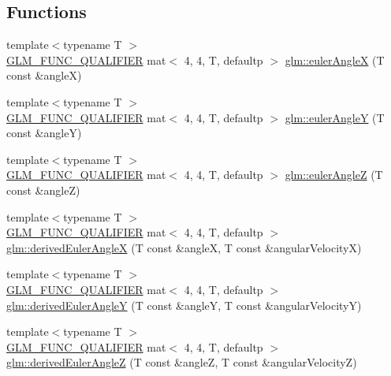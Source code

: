 \subsection*{Functions}
\begin{DoxyCompactItemize}
\item 
{\footnotesize template$<$typename T $>$ }\\\mbox{\hyperlink{setup_8hpp_a33fdea6f91c5f834105f7415e2a64407}{G\+L\+M\+\_\+\+F\+U\+N\+C\+\_\+\+Q\+U\+A\+L\+I\+F\+I\+ER}} mat$<$ 4, 4, T, defaultp $>$ \mbox{\hyperlink{group__gtx__euler__angles_gafba6282e4ed3ff8b5c75331abfba3489}{glm\+::euler\+AngleX}} (T const \&angleX)
\item 
{\footnotesize template$<$typename T $>$ }\\\mbox{\hyperlink{setup_8hpp_a33fdea6f91c5f834105f7415e2a64407}{G\+L\+M\+\_\+\+F\+U\+N\+C\+\_\+\+Q\+U\+A\+L\+I\+F\+I\+ER}} mat$<$ 4, 4, T, defaultp $>$ \mbox{\hyperlink{group__gtx__euler__angles_gab84bf4746805fd69b8ecbb230e3974c5}{glm\+::euler\+AngleY}} (T const \&angleY)
\item 
{\footnotesize template$<$typename T $>$ }\\\mbox{\hyperlink{setup_8hpp_a33fdea6f91c5f834105f7415e2a64407}{G\+L\+M\+\_\+\+F\+U\+N\+C\+\_\+\+Q\+U\+A\+L\+I\+F\+I\+ER}} mat$<$ 4, 4, T, defaultp $>$ \mbox{\hyperlink{group__gtx__euler__angles_ga5b3935248bb6c3ec6b0d9297d406e251}{glm\+::euler\+AngleZ}} (T const \&angleZ)
\item 
{\footnotesize template$<$typename T $>$ }\\\mbox{\hyperlink{setup_8hpp_a33fdea6f91c5f834105f7415e2a64407}{G\+L\+M\+\_\+\+F\+U\+N\+C\+\_\+\+Q\+U\+A\+L\+I\+F\+I\+ER}} mat$<$ 4, 4, T, defaultp $>$ \mbox{\hyperlink{group__gtx__euler__angles_ga994b8186b3b80d91cf90bc403164692f}{glm\+::derived\+Euler\+AngleX}} (T const \&angleX, T const \&angular\+VelocityX)
\item 
{\footnotesize template$<$typename T $>$ }\\\mbox{\hyperlink{setup_8hpp_a33fdea6f91c5f834105f7415e2a64407}{G\+L\+M\+\_\+\+F\+U\+N\+C\+\_\+\+Q\+U\+A\+L\+I\+F\+I\+ER}} mat$<$ 4, 4, T, defaultp $>$ \mbox{\hyperlink{group__gtx__euler__angles_ga0a4c56ecce7abcb69508ebe6313e9d10}{glm\+::derived\+Euler\+AngleY}} (T const \&angleY, T const \&angular\+VelocityY)
\item 
{\footnotesize template$<$typename T $>$ }\\\mbox{\hyperlink{setup_8hpp_a33fdea6f91c5f834105f7415e2a64407}{G\+L\+M\+\_\+\+F\+U\+N\+C\+\_\+\+Q\+U\+A\+L\+I\+F\+I\+ER}} mat$<$ 4, 4, T, defaultp $>$ \mbox{\hyperlink{group__gtx__euler__angles_gae8b397348201c42667be983ba3f344df}{glm\+::derived\+Euler\+AngleZ}} (T const \&angleZ, T const \&angular\+VelocityZ)

\end{DoxyCompactItemize}
